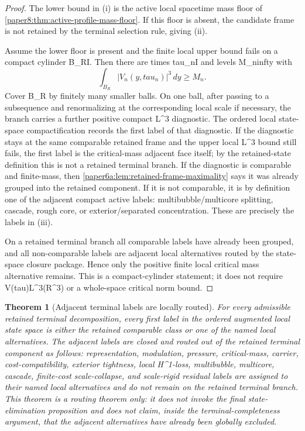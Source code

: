 \documentclass[11pt]{amsart}
\def\({}%
\def\){}%
\def\mathbb#1{#1}%
\def\tau{tau}%
\def\infty{infty}%
\theoremstyle{plain}
\newtheorem{theorem}{Theorem}[section]
\theoremstyle{definition}
\theoremstyle{remark}
\begin{document}
\begin{proof}
The lower bound in \textup{(i)} is the active local spacetime mass floor of
\cref{paper8:thm:active-profile-mass-floor}.  If this floor is absent, the
candidate frame is not retained by the terminal selection rule, giving
\textup{(ii)}.
\par
Assume the lower floor is present and the finite local upper bound fails on a
compact cylinder \(B_R\times I\).  Then there are times \(\tau_n\in I\) and
levels \(M_n\to\infty\) with
\[
  \int_{B_R}|V_n(y,\tau_n)|^3\,dy\ge M_n .
\]
Cover \(B_R\) by finitely many smaller balls.  On one ball, after passing to a
subsequence and renormalizing at the corresponding local scale if necessary,
the branch carries a further positive compact \(L^3\) diagnostic.  The ordered
local state-space compactification records the first label of that diagnostic.
If the diagnostic stays at the same comparable retained frame and the upper
local \(L^3\) bound still fails, the first label is the critical-mass adjacent
face itself; by the retained-state definition this is not a retained terminal
branch.  If the diagnostic is comparable and finite-mass, then
\cref{paper6a:lem:retained-frame-maximality} says it was already grouped into
the retained component.  If it is not comparable, it is by definition one of
the adjacent compact active labels: multibubble/multicore splitting, cascade,
rough core, or exterior/separated concentration.  These are precisely the
labels in \textup{(iii)}.
\par
On a retained terminal branch all comparable labels have already been grouped,
and all non-comparable labels are adjacent local alternatives routed by the
state-space closure package.  Hence only the positive finite local critical
mass alternative remains.  This is a compact-cylinder statement; it does not
require \(V(\tau)\in L^3(\mathbb R^3)\) or a whole-space critical norm bound.
\end{proof}

\begin{theorem}[Adjacent terminal labels are locally routed]
\label{paper6a:thm:terminal-adjacent-label-routing}
For every admissible retained terminal decomposition, every first label in the
ordered augmented local state space is either the retained comparable class or
one of the named local alternatives.  The adjacent labels are closed and routed
out of the retained terminal component as follows:
representation, modulation, pressure, critical-mass, carrier,
cost-compatibility, exterior tightness, local \(H^1\)-loss, multibubble,
multicore, cascade, finite-cost scale-collapse, and scale-rigid residual labels
are assigned to their named local alternatives and do not remain on the
retained terminal branch.  This theorem is a routing theorem only: it does not
invoke the final state-elimination proposition and does not claim, inside the
terminal-completeness argument, that the adjacent alternatives have already
been globally excluded.
\end{theorem}
\end{document}
